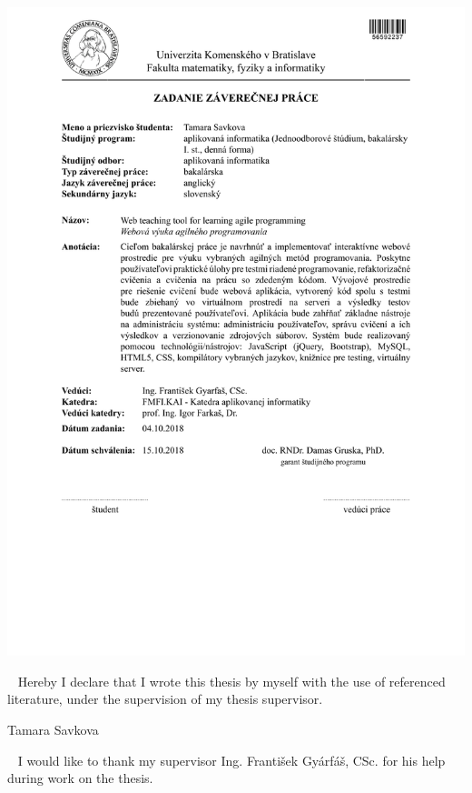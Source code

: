 \documentclass[12pt, oneside]{book}  %
\def\mfautor{Tamara Savkova}
\begin{document}
\newpage 
\thispagestyle{empty}
\hspace{-2cm}\includegraphics[width=1.1\textwidth]{images/zadanie-sk}


\frontmatter

\setcounter{page}{3}
\newpage ~
\vfill
Hereby I declare that I wrote this thesis by myself with the use of referenced literature, under the supervision of my thesis supervisor.
\begin{flushright}
\mfautor
\end{flushright}

\frontmatter

\setcounter{page}{4}
\newpage ~
\vfill
I would like to thank my supervisor Ing. František Gyárfáš, CSc. for his help during work on the thesis.
\vfill
\end{document}
